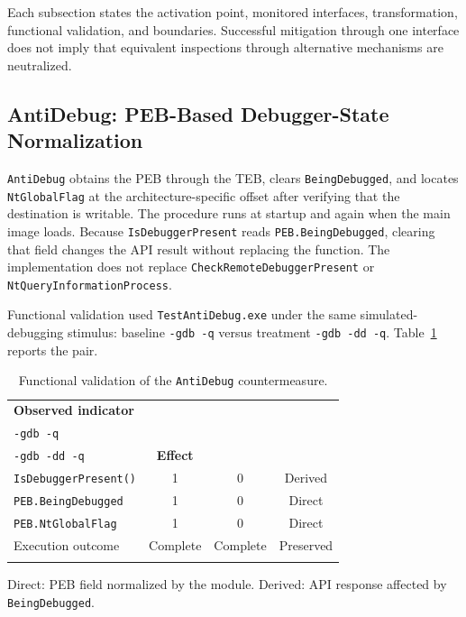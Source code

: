 \documentclass[pdflatex,sn-mathphys-num]{sn-jnl}
\theoremstyle{thmstyleone}
\theoremstyle{thmstyletwo}
\theoremstyle{thmstylethree}
\begin{document}
Each subsection states the activation point, monitored interfaces, transformation, functional validation, and boundaries. Successful mitigation through one interface does not imply that equivalent inspections through alternative mechanisms are neutralized.

\subsection{AntiDebug: PEB-Based Debugger-State Normalization}
\label{subsec:antidebug_implementation}

\texttt{AntiDebug} obtains the PEB through the TEB, clears \texttt{BeingDebugged}, and locates \texttt{NtGlobalFlag} at the architecture-specific offset after verifying that the destination is writable. The procedure runs at startup and again when the main image loads. Because \texttt{IsDebuggerPresent} reads \texttt{PEB.BeingDebugged}, clearing that field changes the API result without replacing the function. The implementation does not replace \texttt{CheckRemoteDebuggerPresent} or \texttt{NtQueryInformationProcess}.

Functional validation used \texttt{TestAntiDebug.exe} under the same simulated-debugging stimulus: baseline \texttt{-gdb -q} versus treatment \texttt{-gdb -dd -q}. Table~\ref{tab:antidebug_validation} reports the pair.

\begin{table}[t]
\caption{Functional validation of the \texttt{AntiDebug} countermeasure.}
\label{tab:antidebug_validation}
\centering
\small
\begin{tabularx}{\columnwidth}{@{}Xccc@{}}
\toprule
\textbf{Observed indicator} & \shortstack{\textbf{Baseline}\\\texttt{-gdb -q}} & \shortstack{\textbf{AntiDebug}\\\texttt{-gdb -dd -q}} & \textbf{Effect} \\
\midrule
\texttt{IsDebuggerPresent()} & 1 & 0 & Derived \\
\texttt{PEB.BeingDebugged} & 1 & 0 & Direct \\
\texttt{PEB.NtGlobalFlag} & 1 & 0 & Direct \\
Execution outcome & Complete & Complete & Preserved \\
\botrule
\end{tabularx}
\vspace{3pt}
\parbox{\columnwidth}{\footnotesize Direct: PEB field normalized by the module. Derived: API response affected by \texttt{BeingDebugged}.}
\end{table}
\end{document}
